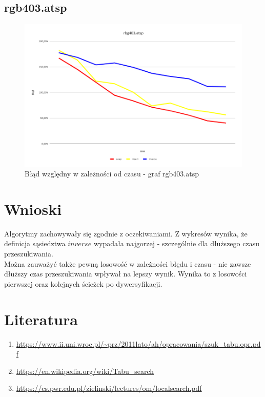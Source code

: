\documentclass{article}
\begin{document}
\subsection{rgb403.atsp}
\begin{figure}[h!]
\centering
\includegraphics[width=\textwidth]{img/403.png}
\caption{Błąd względny w zależności od czasu - graf rgb403.atsp}
\end{figure}


\section{Wnioski}

Algorytmy zachowywały się zgodnie z oczekiwaniami. 
Z wykresów wynika, że definicja sąsiedztwa $inverse$ wypadała najgorzej - szczególnie dla dłuższego czasu przeszukiwania. \\
Można zauważyć także pewną losowość w zależności błędu i czasu - nie zawsze dłuższy czas przeszukiwania wpływał na lepszy wynik. Wynika to z losowości pierwszej oraz kolejnych ścieżek po dywersyfikacji.

\section{Literatura}

\begin{enumerate}
    \item \url{https://www.ii.uni.wroc.pl/~prz/2011lato/ah/opracowania/szuk_tabu.opr.pdf}
    \item \url{https://en.wikipedia.org/wiki/Tabu_search}
    \item \url{https://cs.pwr.edu.pl/zielinski/lectures/om/localsearch.pdf} 
\end{enumerate}
\end{document}
